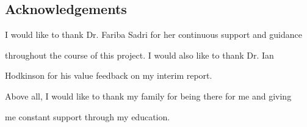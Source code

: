 \documentclass{report}
\begin{document}





\begin{abstract}


\end{abstract}










\subsection*{\centering Acknowledgements}

I would like to thank Dr. Fariba Sadri for her continuous support and guidance

throughout the course of this project. I would also like to thank Dr. Ian

Hodkinson for his value feedback on my interim report.



Above all, I would like to thank my family for being there for me and giving

me constant support through my education.








\tableofcontents





\end{document}
